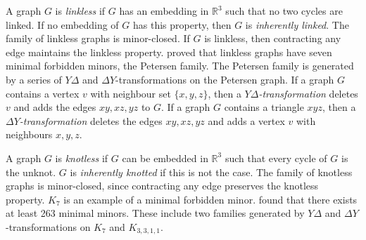 A graph $G$ is \textit{linkless} if $G$ has an embedding in $\mathbb{R}^3$ such that no two cycles are linked. If no embedding of $G$ has this property, then $G$ is \textit{inherently linked}. The family of linkless graphs is minor-closed. If $G$ is linkless, then contracting any edge maintains the linkless property. \textcite{robertsonSachsLinklessEmbedding1995} proved that linkless graphs have seven minimal forbidden minors, the Petersen family. The Petersen family is generated by a series of $Y \Delta$ and $\Delta Y$-transformations on the Petersen graph. If a graph $G$ contains a vertex $v$ with neighbour set $\{x,y,z\}$, then a \textit{$Y \Delta$-transformation} deletes $v$ and adds the edges $xy,xz, yz$ to $G$. If a graph $G$ contains a triangle $xyz$, then a \textit{$\Delta Y$-transformation} deletes the edges $xy, xz, yz$ and adds a vertex $v$ with neighbours $x, y, z$. 

A graph $G$ is \textit{knotless} if $G$ can be embedded in $\mathbb{R}^3$ such that every cycle of $G$ is the unknot. $G$ is \textit{inherently knotted} if this is not the case. The family of knotless graphs is minor-closed, since contracting any edge preserves the knotless property. $K_7$ is an example of a minimal forbidden minor. \textcite{goldbergManyManyMore2014} found that there exists at least 263 minimal minors. These include two families generated by $Y \Delta$ and $\Delta Y$-transformations on $K_7$ and $K_{3,3,1,1}$. 

